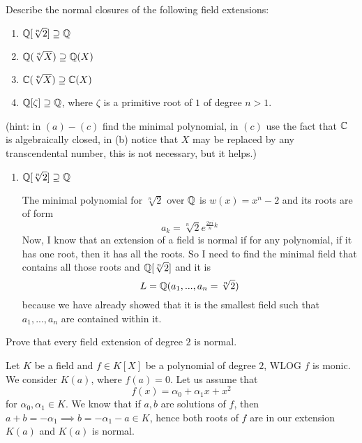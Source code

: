 \documentclass{article}
\begin{document}

\begin{problem}[2]{}
Describe the normal closures of the following field extensions:
\begin{enumerate}[label=(\alph*)]
    \item $\mathbb{Q}[\sqrt[n]{2}]\supseteq\mathbb{Q}$
    \item $\mathbb{Q}(\sqrt[n]{X})\supseteq\mathbb{Q}(X)$
    \item $\mathbb{C}(\sqrt[n]{X})\supseteq\mathbb{C}(X)$
    \item $\mathbb{Q}[\zeta]\supseteq\mathbb{Q}$, where $\zeta$ is a primitive root of $1$ of degree $n>1$.
\end{enumerate}
(hint: in $(a)-(c)$ find the minimal polynomial, in $(c)$ use the fact that $\mathbb{C}$ is algebraically closed, in (b) notice that $X$ may be replaced by any transcendental number, this is not necessary, but it helps.)
\end{problem}

\begin{enumerate}[label=(\alph*), leftmargin=*]
    \item $\mathbb{Q}[\sqrt[n]{2}]\supseteq\mathbb{Q}$

    The minimal polynomial for $\sqrt[n]{2}$ over $\mathbb{Q}$ is $w(x)=x^n-2$ and its roots are of form
    $$a_k=\sqrt[n]{2}e^{\frac{2\pi i}{n}k}$$
    Now, I know that an extension of a field is normal if for any polynomial, if it has one root, then it has all the roots. So I need to find the minimal field that contains all those roots and $\mathbb{Q}[\sqrt[n]{2}]$ and it is
    $$L=\mathbb{Q}(a_1,...,a_n=\sqrt[n]{2})$$
    because we have already showed that it is the smallest field such that $a_1,...,a_n$ are contained within it.
\end{enumerate}

\begin{problem}[3]{}
Prove that every field extension of degree $2$ is normal.
\end{problem}

Let $K$ be a field and $f\in K[X]$ be a polynomial of degree $2$, WLOG $f$ is monic. We consider $K(a)$, where $f(a)=0$. Let us assume that
$$f(x)=\alpha_0+\alpha_1x+x^2$$
for $\alpha_0,\alpha_1\in K$. We know that if $a,b$ are solutions of $f$, then $a+b=-\alpha_1\implies b=-\alpha_1-a\in K$, hence both roots of $f$ are in our extension $K(a)$ and $K(a)$ is normal.

\end{document}
